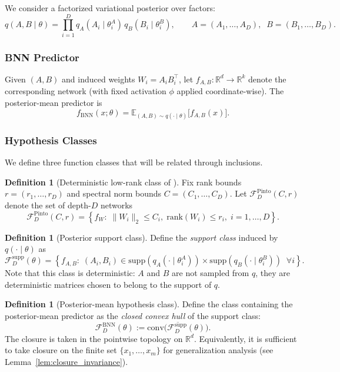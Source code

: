 \documentclass{article}
\theoremstyle{plain}
\theoremstyle{definition}
\newtheorem{definition}[theorem]{Definition}
\theoremstyle{remark}
\begin{document}
We consider a factorized variational posterior over factors:
\[
q(A,B\mid\theta)=\prod_{i=1}^D q_A(A_i\mid\theta_i^A)\,q_B(B_i\mid\theta_i^B),
\qquad
A=(A_1,\ldots,A_D),\;\;B=(B_1,\ldots,B_D).
\]

\subsubsection{BNN Predictor}

Given $(A,B)$ and induced weights $W_i=A_iB_i^\top$, let $f_{A,B}:\mathbb{R}^d\to\mathbb{R}^k$ denote the corresponding network (with fixed activation $\phi$ applied coordinate-wise). The posterior-mean predictor is
\[
f_{\mathrm{BNN}}(x;\theta) = \mathbb{E}_{(A,B)\sim q(\cdot\mid\theta)}\big[f_{A,B}(x)\big].
\]

\subsubsection{Hypothesis Classes}

We define three function classes that will be related through inclusions.

\begin{definition}[Deterministic low-rank class of \citet{pinto2025on}]
\label{def:pinto_class}
Fix rank bounds $r=(r_1,\ldots,r_D)$ and spectral norm bounds $C=(C_1,\ldots,C_D)$. Let $\mathcal{F}^{\mathrm{Pinto}}_D(C,r)$ denote the set of depth-$D$ networks
\[
\mathcal{F}^{\mathrm{Pinto}}_D(C,r)
=
\left\{
f_W:\; \|W_i\|_2\le C_i,\;\mathrm{rank}(W_i)\le r_i,\; i=1,\ldots,D
\right\}.
\]
\end{definition}

\begin{definition}[Posterior support class]
\label{def:supp_class}
Define the \emph{support class} induced by $q(\cdot\mid\theta)$ as
\[
\mathcal{F}^{\mathrm{supp}}_D(\theta)
=
\left\{
f_{A,B}:\; (A_i,B_i)\in \mathrm{supp}(q_A(\cdot\mid\theta_i^A))\times\mathrm{supp}(q_B(\cdot\mid\theta_i^B))
\;\;\forall i
\right\}.
\]
Note that this class is deterministic: $A$ and $B$ are not sampled from $q$, they are deterministic matrices chosen to belong to the support of $q$.
\end{definition}

\begin{definition}[Posterior-mean hypothesis class]
\label{def:bnn_class}
Define the class containing the posterior-mean predictor as the \emph{closed convex hull} of the support class:
\[
\mathcal{F}^{\mathrm{BNN}}_D(\theta)
:=
\overline{\mathrm{conv}\big(\mathcal{F}^{\mathrm{supp}}_D(\theta)\big)}.
\]
The closure is taken in the pointwise topology on $\mathbb{R}^d$. Equivalently, it is sufficient to take closure on the finite set $\{x_1,\ldots,x_m\}$ for generalization analysis (see Lemma~\ref{lem:closure_invariance}).
\end{definition}
\end{document}
